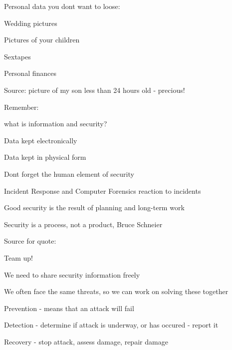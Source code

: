 \documentclass[Screen16to9,17pt]{foils}
\begin{document}

\begin{list1}
\item Personal data you dont want to loose:
\begin{list2}
\item Wedding pictures
\item Pictures of your children
\item Sextapes
\item Personal finances
\end{list2}
\end{list1}

Source: picture of my son less than 24 hours old - precious!


\begin{list1}
\item Remember:
\begin{list2}
\item what is information and security?
\item Data kept electronically
\item Data kept in physical form
\item Dont forget the human element of security
\end{list2}
\item Incident Response and Computer Forensics reaction to incidents
\item Good security is the result of planning and long-term work
\end{list1}
\vskip 1cm
\centerline{\color{titlecolor}\LARGE Security is a process, not a product, Bruce Schneier}

Source for quote: 




\begin{list1}
\item Team up!
\item We need to share security information freely
\item We often face the same threats, so we can work on solving these together
\end{list1}


\begin{list1}
\item Prevention - means that an attack will fail
\item Detection - determine if attack is underway, or has occured - report it
\item Recovery - stop attack, assess damage, repair damage
\end{list1}
\end{document}
